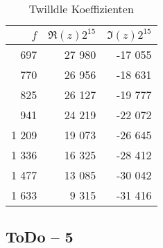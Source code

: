 \begin{table}[h!]
	\centering
	\begin{tabular}{r r r}
		$f$	& $\Re(z) 2^{15}$	& $\Im(z) 2^{15}$ \\
		\hline
		697	& 27 980	& -17 055 \\
		770	& 26 956	& -18 631 \\
		825	& 26 127	& -19 777 \\
		941	& 24 219	& -22 072 \\
		1 209	& 19 073	& -26 645 \\
		1 336	& 16 325	& -28 412 \\
		1 477	& 13 085	& -30 042 \\
		1 633	& 9 315		& -31 416 \\
	\end{tabular}
	\caption{Twilldle Koeffizienten}
\end{table}

\subsection{ToDo -- 5}

